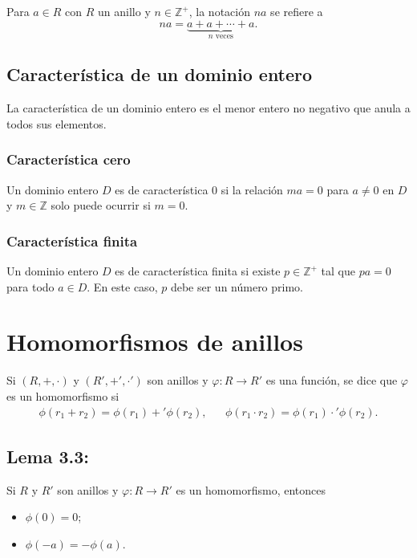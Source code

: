\documentclass{article}
\begin{document}
Para $a\in R$ con $R$ un anillo y $n\in\mathbb{Z}^{+}$, la notación $na$ se refiere a
$$na=\underbrace{a+a+\cdots+a}_{\text{$n$ veces}}.$$

\subsection*{\color{violet} Característica de un dominio entero}

La característica de un dominio entero es el menor entero no negativo que anula a todos sus elementos.

\subsubsection*{\color{teal} Característica cero}

Un dominio entero $D$ es de característica 0 si la relación $ma=0$ para $a\neq 0$ en $D$ y $m\in\mathbb{Z}$ solo puede ocurrir si $m=0$.

\subsubsection*{\color{teal} Característica finita}

Un dominio entero $D$ es de característica finita si existe $p\in\mathbb{Z}^{+}$ tal que $pa=0$ para todo $a\in D$. En este caso, $p$ debe ser un número primo.

\newpage
\section{Homomorfismos de anillos}

Si $(R,+,\cdot)$ y $(R',+',\cdot')$ son anillos y $\varphi:R\to R'$ es una función, se dice que $\varphi$ es un homomorfismo si
\begin{align*}
\phi(r_1+r_2)=\phi(r_1)+'\phi(r_2), && \phi(r_1\cdot r_2)=\phi(r_1)\cdot'\phi(r_2).
\end{align*}

\subsection*{\color{blue} Lema 3.3:}

Si $R$ y $R'$ son anillos y $\varphi:R\to R'$ es un homomorfismo, entonces

\begin{itemize}
\item $\phi(0)=0$;
\item $\phi(-a)=-\phi(a)$.
\end{itemize}
\end{document}
